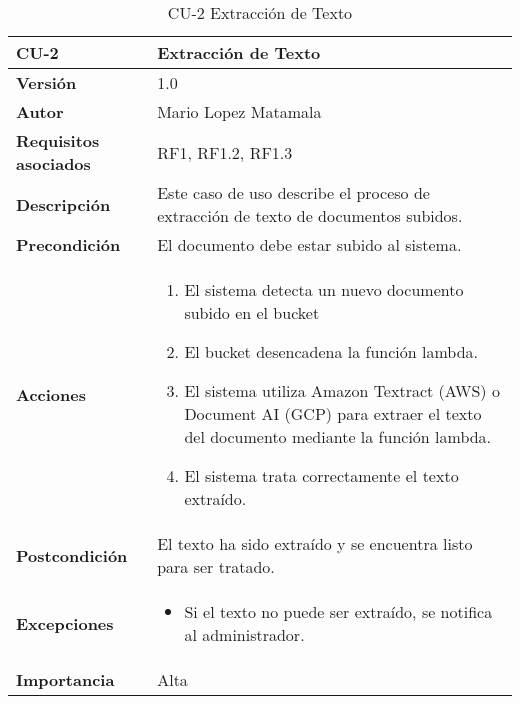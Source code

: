 \vspace{1cm}

\begin{table}[p]
\centering
\begin{tabularx}{\linewidth}{ p{} p{} }
\toprule
\textbf{CU-2} & \textbf{Extracción de Texto} \\
\toprule
\textbf{Versión} & 1.0 \\
\textbf{Autor} & Mario Lopez Matamala \\
\textbf{Requisitos asociados} & RF1, RF1.2, RF1.3 \\
\textbf{Descripción} & Este caso de uso describe el proceso de extracción de texto de documentos subidos. \\
\textbf{Precondición} & El documento debe estar subido al sistema. \\
\textbf{Acciones} &
\begin{enumerate}
\def\labelenumi{\arabic{enumi}.}
\tightlist
\item El sistema detecta un nuevo documento subido en el bucket
\item El bucket desencadena la función lambda.
\item El sistema utiliza Amazon Textract (AWS) o Document AI (GCP) para extraer el texto del documento mediante la función lambda.
\item El sistema trata correctamente el texto extraído.
\end{enumerate} \\
\textbf{Postcondición} & El texto ha sido extraído y se encuentra listo para ser tratado.\\
\textbf{Excepciones} &
\begin{itemize}
\item Si el texto no puede ser extraído, se notifica al administrador.
\end{itemize} \\
\textbf{Importancia} & Alta \\
\bottomrule
\end{tabularx}
\caption{CU-2 Extracción de Texto}
\label{tab:cu2}
\end{table}

\vspace{1cm}

